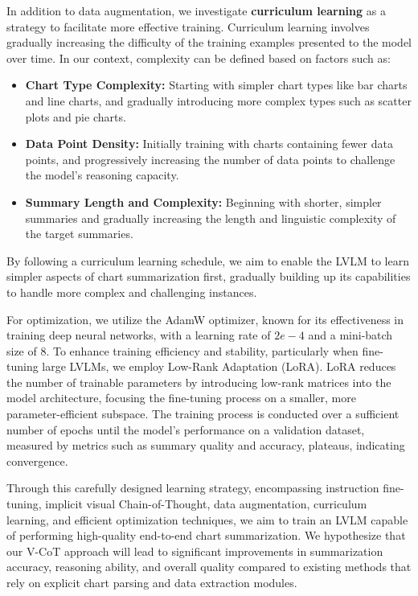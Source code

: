 In addition to data augmentation, we investigate \textbf{curriculum learning} as a strategy to facilitate more effective training.  Curriculum learning involves gradually increasing the difficulty of the training examples presented to the model over time.  In our context, complexity can be defined based on factors such as:

\begin{itemize}
    \item \textbf{Chart Type Complexity:}  Starting with simpler chart types like bar charts and line charts, and gradually introducing more complex types such as scatter plots and pie charts.
    \item \textbf{Data Point Density:}  Initially training with charts containing fewer data points, and progressively increasing the number of data points to challenge the model's reasoning capacity.
    \item \textbf{Summary Length and Complexity:}  Beginning with shorter, simpler summaries and gradually increasing the length and linguistic complexity of the target summaries.
\end{itemize}
By following a curriculum learning schedule, we aim to enable the LVLM to learn simpler aspects of chart summarization first, gradually building up its capabilities to handle more complex and challenging instances.

For optimization, we utilize the AdamW optimizer, known for its effectiveness in training deep neural networks, with a learning rate of $2e-4$ and a mini-batch size of 8.  To enhance training efficiency and stability, particularly when fine-tuning large LVLMs, we employ Low-Rank Adaptation (LoRA). LoRA reduces the number of trainable parameters by introducing low-rank matrices into the model architecture, focusing the fine-tuning process on a smaller, more parameter-efficient subspace.  The training process is conducted over a sufficient number of epochs until the model's performance on a validation dataset, measured by metrics such as summary quality and accuracy, plateaus, indicating convergence.

Through this carefully designed learning strategy, encompassing instruction fine-tuning, implicit visual Chain-of-Thought, data augmentation, curriculum learning, and efficient optimization techniques, we aim to train an LVLM capable of performing high-quality end-to-end chart summarization. We hypothesize that our V-CoT approach will lead to significant improvements in summarization accuracy, reasoning ability, and overall quality compared to existing methods that rely on explicit chart parsing and data extraction modules.

